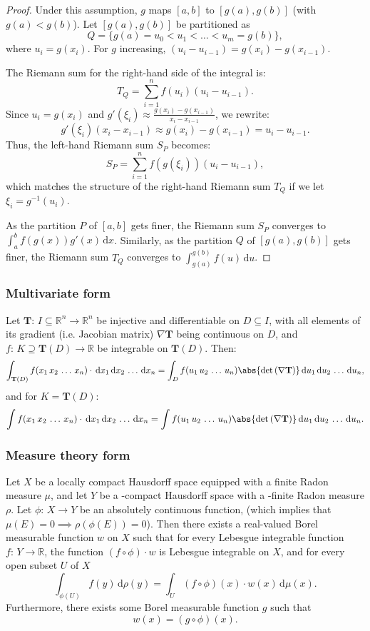 \documentclass[a4paper,12pt]{report}
\begin{document}
{{{{{{{{{{{{\begin{proof}
Under this assumption, \(g\) maps \([a, b]\) to \([g(a), g(b)]\) (with \(g(a) < g(b)\)). Let \([g(a), g(b)]\) be partitioned as
\[Q = \{g(a) = u_0 < u_1 < \dots  < u_m = g(b)\},\]
where \(u_i = g(x_i)\). For \(g\) increasing, \((u_i - u_{i-1}) = g(x_i) - g(x_{i-1})\).

The Riemann sum for the right-hand side of the integral is:
\[T_Q = \sum_{i=1}^n f(u_i) (u_i - u_{i-1}).\]
Since \(u_i = g(x_i)\) and \(g'(\xi_i) \approx \frac{g(x_i) - g(x_{i-1})}{x_i - x_{i-1}}\), we rewrite:
\[ g'(\xi_i) (x_i - x_{i-1}) \approx g(x_i) - g(x_{i-1}) = u_i - u_{i-1}. \]
Thus, the left-hand Riemann sum \(S_P\) becomes:
\[ S_P = \sum_{i=1}^n f(g(\xi_i)) (u_i - u_{i-1}),\]
which matches the structure of the right-hand Riemann sum \(T_Q\) if we let \(\xi_i = g^{-1}(u_i)\).

As the partition \(P\) of \([a, b]\) gets finer, the Riemann sum \(S_P\) converges to \(\int_a^b f(g(x)) g'(x) \, \mathrm{d}x\). Similarly, as the partition \(Q\) of \([g(a), g(b)]\) gets finer, the Riemann sum \(T_Q\) converges to \(\int_{g(a)}^{g(b)} f(u) \, \mathrm{d}u\).
\end{proof}
\subsubsection{Multivariate form}
Let $\mathbf{T}:\,I\subseteq\mathbb{R}^n\to\mathbb{R}^n$ be injective and differentiable on $D\subseteq I$, with all elements of its gradient (i.e. Jacobian matrix) $\nabla\mathbf{T}$ being continuous on $D$, and $f:\,K\supseteq\mathbf{T}(D)\to\mathbb{R}$ be integrable on $\mathbf{T}(D)$. Then:
\[\int_{\mathbf{T}(D)}f(x_1\,x_2\,\dots\,x_n)\cdot\,\mathrm{d}x_1\,\mathrm{d}x_2\,\dots\,\mathrm{d}x_n=\int_D f(u_1\,u_2\,\dots\,u_n)\abs{\det\left(\nabla\mathbf{T}\right)}\,\mathrm{d}u_1\,\mathrm{d}u_2\,\dots\,\mathrm{d}u_n,\]
and for $K=\mathbf{T}(D)$:
\[\int f(x_1\,x_2\,\dots\,x_n)\cdot\,\mathrm{d}x_1\,\mathrm{d}x_2\,\dots\,\mathrm{d}x_n=\int f(u_1\,u_2\,\dots\,u_n)\abs{\det\left(\nabla\mathbf{T}\right)}\,\mathrm{d}u_1\,\mathrm{d}u_2\,\dots\,\mathrm{d}u_n.\]
\subsubsection{Measure theory form}
Let $X$ be a locally compact Hausdorff space equipped with a finite Radon measure $μ$, and let $Y$ be a \text{\textsigma}-compact Hausdorff space with a \text{\textsigma}-finite Radon measure $\rho$. Let $\phi:\,X\to Y$ be an absolutely continuous function, (which implies that $\mu(E)=0\implies\rho(\phi(E))=0$). Then there exists a real-valued Borel measurable function $w$ on $X$ such that for every Lebesgue integrable function $f:\,Y\to\mathbb{R}$, the function $(f\circ\phi)\cdot w$ is Lebesgue integrable on $X$, and for every open subset $U$ of $X$
\[\int_{\phi(U)}f(y)\,\mathrm{d}\rho(y)=\int_U(f\circ\phi)(x)\cdot w(x)\,\mathrm{d}\mu(x).\]
Furthermore, there exists some Borel measurable function $g$ such that 
\[w(x)=(g\circ\phi)(x).\]
}}}}}}}}}}}}
\end{document}
